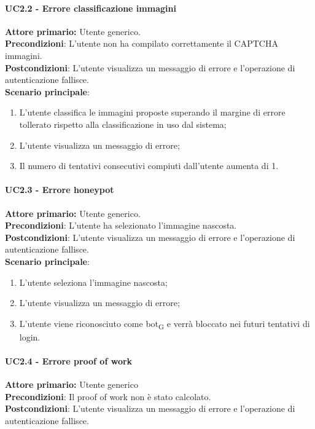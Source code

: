 \paragraph{UC2.2 - Errore classificazione immagini}
\textbf{Attore primario:} Utente generico.\\
    \textbf{Precondizioni}: L’utente non ha compilato correttamente il CAPTCHA immagini.\\
\textbf{Postcondizioni}: L’utente visualizza un messaggio di errore e l’operazione di autenticazione fallisce.\\

\textbf{Scenario principale}:
\begin{enumerate}
    \item L'utente classifica le immagini proposte superando il margine di errore tollerato rispetto alla classificazione in uso dal sistema;
	\item L’utente visualizza un messaggio di errore;
	\item Il numero di tentativi consecutivi compiuti dall’utente aumenta di 1.
\end{enumerate}

\paragraph{UC2.3 - Errore honeypot}
\textbf{Attore primario:} Utente generico.\\
\textbf{Precondizioni}: L’utente ha selezionato l'immagine nascosta.\\
\textbf{Postcondizioni}: L’utente visualizza un messaggio di errore e l’operazione di autenticazione fallisce.\\

\textbf{Scenario principale}:
\begin{enumerate}
    \item L'utente seleziona l'immagine nascosta;
	\item L’utente visualizza un messaggio di errore;
	\item L'utente viene riconosciuto come bot\textsubscript{G} e verrà bloccato nei futuri tentativi di login.
\end{enumerate}

\paragraph{UC2.4 - Errore proof of work}
\textbf{Attore primario:} Utente generico\\
\textbf{Precondizioni}: Il proof of work non è stato calcolato.\\
\textbf{Postcondizioni}:  L’utente visualizza un messaggio di errore e l’operazione di autenticazione fallisce.\\


